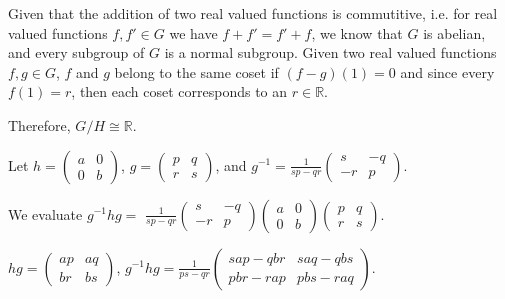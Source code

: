\documentclass{article}
\theoremstyle{plain} %
\theoremstyle{definition} %
\begin{document}
\noindent{}

Given that the addition of two real valued functions is commutitive, i.e. for real valued functions
$f, f' \in G$ we have $f + f' = f' + f$, we know that $G$ is abelian, and every subgroup of $G$ is a normal subgroup.
Given two real valued functions $f,g \in G$, $f$ and $g$ belong to the same coset if
$(f-g)(1) = 0$ and since every $f(1) = r$, then each coset corresponds to an $r \in \mathbb{R}$.

Therefore, $G/H \cong \mathbb{R}$.

\noindent{}

Let $h= \left( \begin{matrix}
    a & 0 \\ 0 & b
\end{matrix} \right)$,
$g = \left( \begin{matrix}
    p & q \\ r & s
\end{matrix} \right)$, and 
$g^{-1} = \frac{1}{sp-qr}\left( \begin{matrix}
    s & -q \\ -r & p
\end{matrix} \right)$.

We evaluate $g^{-1}hg = $
$\frac{1}{sp-qr}\left( \begin{matrix}
    s & -q \\ -r & p
\end{matrix} \right)
\left( \begin{matrix}
    a & 0 \\ 0 & b
\end{matrix} \right)
\left( \begin{matrix}
    p & q \\ r & s
\end{matrix} \right)$.

$hg = \left( \begin{matrix}
    ap & aq \\ br & bs
\end{matrix} \right)$,
$g^{-1}hg = \frac{1}{ps-qr}\left( \begin{matrix}
    sap-qbr & saq - qbs \\ pbr - rap & pbs - raq
\end{matrix} \right)$.
\end{document}
